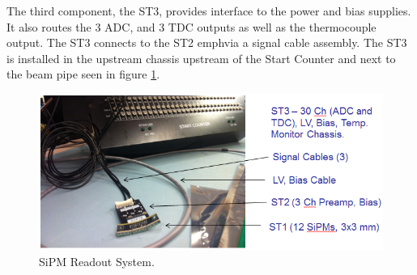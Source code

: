 The third component, the ST3, provides interface to the power and bias supplies.  It also routes the 3 ADC, and 3 TDC outputs as well as the thermocouple output.  The ST3 connects to the ST2 emph{via} a signal cable assembly.  The ST3 is installed in the upstream chassis upstream of the Start Counter and next to the beam pipe seen in figure \ref{fig:SiPM Readout System}.
\begin{figure}[!htb]
	\centering
	\includegraphics[width=1.0\columnwidth]{design/figs/SiPM_Readout_System}
	\caption[SiPM Readout System]{SiPM Readout System.}
	\label{fig:SiPM Readout System}
\end{figure}